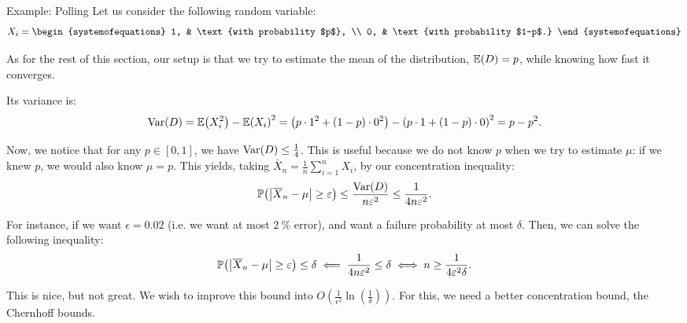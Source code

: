 \documentclass[a4paper]{article}
\begin{document}
\begin{parag}{Example: Polling}
    Let us consider the following random variable: 
    \[X_i = \begin{systemofequations} 1, & \text{with probability $p$}, \\ 0, & \text{with probability $1-p$.} \end{systemofequations}\]

    As for the rest of this section, our setup is that we try to estimate the mean of the distribution, $\exval\left(D\right) = p$, while knowing how fast it converges.

    Its variance is: 
    \[\Var\left(D\right) = \exval\left(X_i^2\right) - \exval\left(X_i\right)^2 = \left(p\cdot 1^2 + \left(1-p\right)\cdot 0^2\right) - \left(p\cdot 1 + \left(1-p\right)\cdot 0\right)^2 = p - p^2.\]

    Now, we notice that for any $p \in \left[0, 1\right]$, we have $\Var\left(D\right) \leq \frac{1}{4}$. This is useful because we do not know $p$ when we try to estimate $\mu$: if we knew $p$, we would also know $\mu = p$. This yields, taking $\bar{X}_n = \frac{1}{n} \sum_{i=1}^{n} X_i$, by our concentration inequality: 
    \[\prob\left(\left|\bar{X}_n - \mu\right| \geq \epsilon\right) \leq \frac{\Var\left(D\right)}{n  \epsilon^2} \leq \frac{1}{4n \epsilon^2}.\]

    For instance, if we want $\epsilon = 0.02$ (i.e. we want at most $\SI{2}{\%}$ error), and want a failure probability at most $\delta$. Then, we can solve the following inequality:
    \[\prob\left(\left|\bar{X}_n - \mu\right| \geq \epsilon\right) \leq \delta \impliedby \frac{1}{4n \epsilon^2} \leq \delta \iff n \geq \frac{1}{4 \epsilon^2 \delta}.\]

    This is nice, but not great. We wish to improve this bound into $O\left(\frac{1}{\epsilon^2} \ln\left(\frac{1}{\delta}\right)\right)$. For this, we need a better concentration bound, the Chernhoff bounds.
\end{parag}
\end{document}
